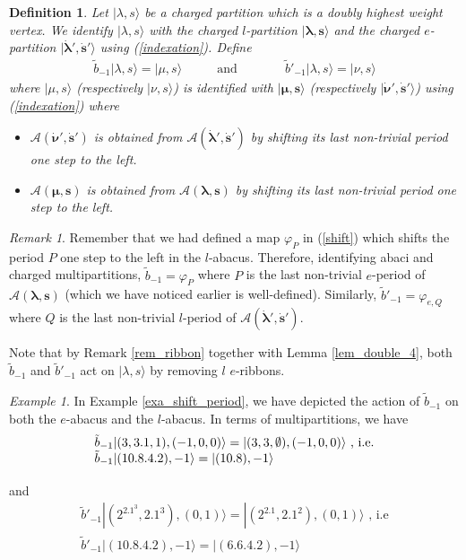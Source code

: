 \documentclass[twoside,12pt]{amsart}
\theoremstyle{plain}
\newcommand{\cA}{\mathcal{A}}
\newcommand{\bs}{\mathbf{s}}
\newcommand{\la}{\lambda}
\newcommand{\bla}{\boldsymbol{\la}}
\newcommand{\bnu}{\boldsymbol{\nu}}
\newcommand{\bmu}{\boldsymbol{\mu}}
\newcommand{\tb}{\tilde{b}}
\newcommand{\dbs}{\dot{\bs}}
\newcommand{\dbla}{\dot{\bla}}
\newcommand{\dbnu}{\dot{\bnu}}
\newcommand{\mand}{\quad\text{and}\quad}
\newtheorem{defi}[num]{Definition}
\theoremstyle{remark}
\newtheorem{exa}[num]{Example}
\newtheorem{rem}[num]{Remark}
\begin{document}
\begin{defi}\label{def_btilde}
Let $|\la,s\rangle$ be a charged partition
which is a doubly highest weight vertex.
We identify $|\la,s\rangle$ with the charged  $l$-partition $|\bla,\bs\rangle$
and the charged $e$-partition $|\dbla',\dbs'\rangle$ using (\ref{indexation}).
Define 
$$
\begin{array}{ccc}
\tb_{-1}|\la,s\rangle = |\mu,s\rangle
&
\quad \mand \quad\quad
&
\tb'_{-1}|\la,s\rangle = |\nu,s\rangle
\end{array}
$$
where $|\mu,s\rangle$ (respectively $|\nu,s\rangle$) 
is identified with $|\bmu,\bs\rangle$ (respectively $|\dbnu',\dbs'\rangle$) 
using (\ref{indexation})
where 
\begin{itemize}
 \item $\cA(\dbnu',\dbs')$ is obtained from $\cA(\dbla',\dbs')$ by shifting its last non-trivial period one step to the left.
\item $\cA(\bmu,\bs)$ is obtained from $\cA(\bla,\bs)$ by shifting its last non-trivial period one step to the left.
\end{itemize}
\end{defi}

\begin{rem}\label{rem_btilde}
Remember that we had defined a map $\varphi_{P}$ in (\ref{shift}) which shifts the period $P$ one step
to the left in the $l$-abacus.
Therefore, identifying abaci and charged multipartitions, $\tb_{-1}=\varphi_{P}$ where $P$ is the last
non-trivial $e$-period of $\cA(\bla,\bs)$ (which we have noticed earlier is well-defined).
Similarly, $\tb'_{-1}=\varphi_{e,Q}$ where $Q$ is the last non-trivial $l$-period of $\cA(\dbla',\dbs')$.
\end{rem}

Note that by Remark \ref{rem_ribbon} together with Lemma \ref{lem_double_4},
both $\tb_{-1}$ and $\tb'_{-1}$ act on $|\la,s\rangle$ by removing $l$ $e$-ribbons.

\begin{exa}\label{exa_btilde}
In Example \ref{exa_shift_period}, we have depicted the action of $\tb_{-1}$ on both the $e$-abacus
and the $l$-abacus.
In terms of multipartitions, we have 
$$
\begin{array}{l}
\tb_{-1}|(3,3.1,1),(-1,0,0)\rangle = | (3,3,\emptyset),(-1,0,0) \rangle \text{ , i.e.} \\
\tb_{-1}|(10.8.4.2),-1\rangle = | (10.8),-1\rangle \vspace{2mm} \\
\end{array}
$$
and
$$\begin{array}{l}
\tb'_{-1}|(2^2.1^3,2.1^3),(0,1)\rangle = | (2^2.1,2.1^2),(0,1) \rangle \text{ , i.e} \\
\tb'_{-1}|(10.8.4.2),-1\rangle = | (6.6.4.2),-1 \rangle \\
\end{array}
$$
\end{exa}
\end{document}
